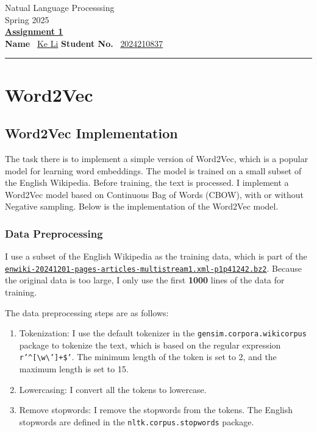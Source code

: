 \documentclass[UTF8,a4paper,12pt]{article}
\begin{document}
\begin{center}
    Natual Language Processsing\\
    Spring 2025\\
    \vspace{0.25cm}
	\underline{\textbf{Assignment 1}}\\
    \vspace{0.5cm}
    \textbf{Name} \ \underline{Ke Li}  \hfill \textbf{Student No.} \ \underline{2024210837} \\
    \vspace{0.1cm}
\end{center}
\hrule
\vspace{0.2cm}

\section{Word2Vec}
\subsection{Word2Vec Implementation}

The task there is to implement a simple version of Word2Vec, which is a popular model for learning word embeddings. The model is trained on a small subset of the English Wikipedia. Before training, the text is processed. I implement a Word2Vec model based on Continuous Bag of Words (CBOW), with or without Negative sampling. Below is the implementation of the Word2Vec model.

\subsubsection{Data Preprocessing}

I use a subset of the English Wikipedia as the training data, which is part of the
\href{https://dumps.wikimedia.org/enwiki/20241201/enwiki-20241201-pages-articles-multistream1.xml-p1p41242.bz2}{\texttt{enwiki-20241201-pages-articles-multistream1.xml-p1p41242.bz2}}. Because the original data is too large, I only use the first \textbf{1000} lines of the data for training. 

The data preprocessing steps are as follows:
\begin{enumerate}
    \item Tokenization: I use the default tokenizer in the \texttt{gensim.corpora.wikicorpus} package to tokenize the text, which is based on the regular expression \texttt{r'\textasciicircum[\textbackslash w\textbackslash'\textquotedbl]+\$'}. The minimum length of the token is set to 2, and the maximum length is set to 15.
    
    \item Lowercasing: I convert all the tokens to lowercase.
    
    \item Remove stopwords: I remove the stopwords from the tokens. The English stopwords are defined in the \texttt{nltk.corpus.stopwords} package.
    
\end{enumerate}
\end{document}

